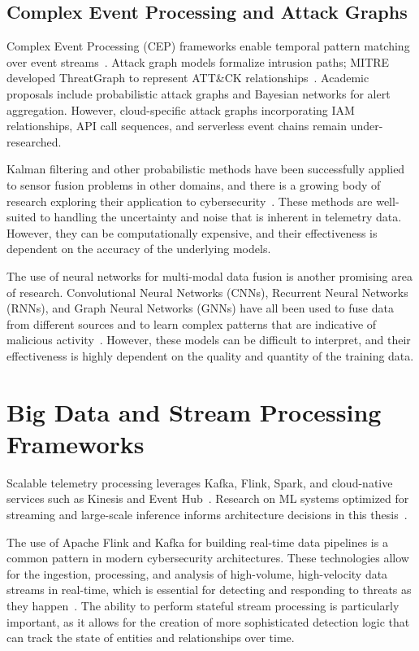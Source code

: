 \subsection{Complex Event Processing and Attack Graphs}
Complex Event Processing (CEP) frameworks enable temporal pattern matching over event streams~\cite{luckham2012cep,albanese2017cep}. Attack graph models formalize intrusion paths; MITRE developed ThreatGraph to represent ATT\&CK relationships~\cite{mitrethreatgraph2023}. Academic proposals include probabilistic attack graphs and Bayesian networks for alert aggregation. However, cloud-specific attack graphs incorporating IAM relationships, API call sequences, and serverless event chains remain under-researched.

Kalman filtering and other probabilistic methods have been successfully applied to sensor fusion problems in other domains, and there is a growing body of research exploring their application to cybersecurity~\cite{ias2024kalman}. These methods are well-suited to handling the uncertainty and noise that is inherent in telemetry data. However, they can be computationally expensive, and their effectiveness is dependent on the accuracy of the underlying models.

The use of neural networks for multi-modal data fusion is another promising area of research. Convolutional Neural Networks (CNNs), Recurrent Neural Networks (RNNs), and Graph Neural Networks (GNNs) have all been used to fuse data from different sources and to learn complex patterns that are indicative of malicious activity~\cite{whiterose2024nnfusion}. However, these models can be difficult to interpret, and their effectiveness is highly dependent on the quality and quantity of the training data.

\section{Big Data and Stream Processing Frameworks}
Scalable telemetry processing leverages Kafka, Flink, Spark, and cloud-native services such as Kinesis and Event Hub~\cite{zaharia2016apache,balaji2021flink}. Research on ML systems optimized for streaming and large-scale inference informs architecture decisions in this thesis~\cite{palkar2018weld}.

The use of Apache Flink and Kafka for building real-time data pipelines is a common pattern in modern cybersecurity architectures. These technologies allow for the ingestion, processing, and analysis of high-volume, high-velocity data streams in real-time, which is essential for detecting and responding to threats as they happen~\cite{confluent2024streaming}. The ability to perform stateful stream processing is particularly important, as it allows for the creation of more sophisticated detection logic that can track the state of entities and relationships over time.

